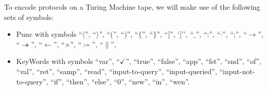 \noindent To encode \ipdl protocols on a Turing Machine tape, we will make use of the following sets of symbols:
\begin{itemize}
\item \textsf{Punc} with symbols \textsf{``$\langle$''}, \textsf{``$\rangle$''}, \textsf{``(''}, \textsf{``)''}, \textsf{``$\{$''}, \textsf{``$\}$''}, \textsf{``[''}, \textsf{`]''}, \textsf{``$\_$''}, \textsf{``:''}, \textsf{``$\cdot$''}, \textsf{``;''}, \textsf{``$\to$''}, \textsf{``$\twoheadrightarrow$''}, \textsf{``$\leftarrow$''}, \textsf{``$\times$''}, \textsf{``$\coloneqq$''}, \textsf{``$\|$''},
\item \textsf{KeyWords} with symbols \textsf{``var''}, \textsf{``$\checkmark$''}, \textsf{``true''}, \textsf{``false''}, \textsf{``app''}, \textsf{``fst''}, \textsf{``snd''}, \textsf{``of''}, \textsf{``val''}, \textsf{``ret''}, \textsf{``samp''}, \textsf{``read''}, \textsf{``input-to-query''}, \textsf{``input-queried''}, \textsf{``input-not-to-query''}, \textsf{``if''}, \textsf{``then''}, \textsf{``else''}, \textsf{``0''}, \textsf{``new''}, \textsf{``in''}, \textsf{``wen''}.
\end{itemize}

